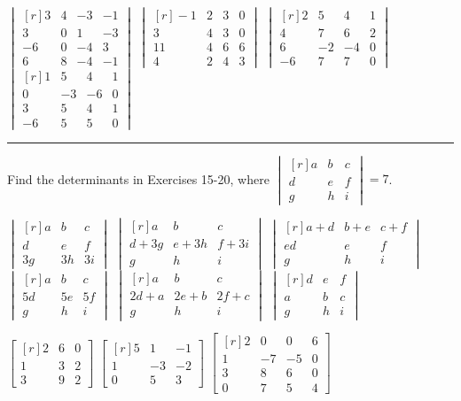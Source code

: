 \documentclass[11pt,answers]{exam} %
\newcommand{\mat}[1]{\begin{bmatrix*}[r] #1 \end{bmatrix*}}
\newcommand{\dett}[1]{\begin{vmatrix*}[r] #1 \end{vmatrix*}}
\begin{document}
\begin{questions}
    
    \question $\dett{3 & 4 & -3 & -1 \\ 3 & 0 & 1 & -3 \\ -6 & 0 & -4 & 3 \\ 6 & 8 & -4 & -1}$
    \question $\dett{-1 & 2 & 3 & 0 \\ 3 & 4 & 3 & 0 \\ 11 & 4 & 6 & 6 \\ 4 & 2 & 4 & 3}$
    \question $\dett{2 & 5 & 4 & 1 \\ 4 & 7 & 6 & 2 \\ 6 & -2 & -4 & 0 \\ -6 & 7 & 7 & 0}$
    \question $\dett{1 & 5 & 4 & 1 \\ 0 & -3 & -6 & 0 \\ 3 & 5 & 4 & 1 \\ -6 & 5 & 5 & 0}$

    \begin{center}\rule{4in}{0.1mm}\end{center}
    Find the determinants in Exercises 15-20, where
    $\dett{a & b & c \\ d & e & f \\ g & h & i} = 7$.

    \question $\dett{a & b & c \\ d & e & f \\ 3g & 3h & 3i}$
    \question $\dett{a & b & c \\ d+3g & e + 3h & f+3i \\ g & h & i}$
    \question $\dett{a+d & b+e & c+f \\ ed & e & f \\ g & h & i}$
    \question $\dett{a & b & c \\ 5d & 5e & 5f \\ g & h & i}$
    \question $\dett{a & b & c \\ 2d+a & 2e+b & 2f+c \\ g & h & i}$
    \question $\dett{d & e & f \\ a & b & c \\ g & h & i}$

    \question $\mat{2 & 6 & 0 \\ 1 & 3 & 2 \\ 3 & 9 & 2}$
    \question $\mat{5 & 1 & -1 \\ 1 & -3 & -2 \\ 0 & 5 & 3}$
    \question $\mat{2 & 0 & 0 & 6 \\ 1 & -7 & -5 & 0 \\ 3 & 8 & 6 & 0 \\ 0 & 7 & 5 & 4}$
     

\end{questions}
\end{document}
